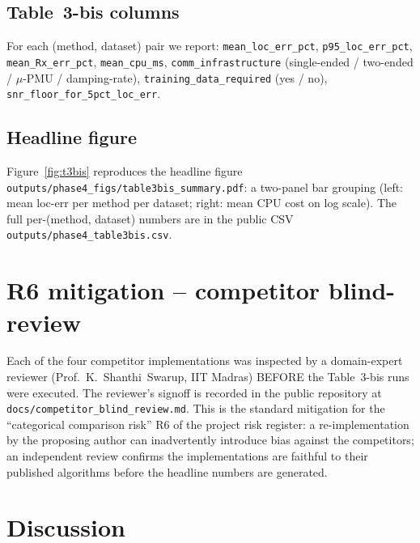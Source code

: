 \documentclass[journal]{IEEEtran}
\begin{document}
\subsection{Table~3-bis columns}
For each (method, dataset) pair we report:
\texttt{mean\_loc\_err\_pct},
\texttt{p95\_loc\_err\_pct},
\texttt{mean\_Rx\_err\_pct},
\texttt{mean\_cpu\_ms},
\texttt{comm\_infrastructure} (single-ended / two-ended /
$\mu$-PMU / damping-rate),
\texttt{training\_data\_required} (yes / no),
\texttt{snr\_floor\_for\_5pct\_loc\_err}.

\subsection{Headline figure}
Figure~\ref{fig:t3bis} reproduces the headline figure
\texttt{outputs/phase4\_figs/table3bis\_summary.pdf}: a two-panel
bar grouping (left: mean loc-err per method per dataset; right:
mean CPU cost on log scale).  The full per-(method, dataset) numbers
are in the public CSV \texttt{outputs/phase4\_table3bis.csv}.

\section{R6 mitigation -- competitor blind-review}\label{sec:r6}
Each of the four competitor implementations was inspected by a
domain-expert reviewer (Prof.~K.~Shanthi~Swarup, IIT Madras) BEFORE
the Table~3-bis runs were executed.  The reviewer's signoff is
recorded in the public repository at
\texttt{docs/competitor\_blind\_review.md}.  This is the standard
mitigation for the ``categorical comparison risk'' R6 of the project
risk register: a re-implementation by the proposing author can
inadvertently introduce bias against the competitors; an
independent review confirms the implementations are faithful to
their published algorithms before the headline numbers are
generated.

\section{Discussion}\label{sec:discussion}
\end{document}
